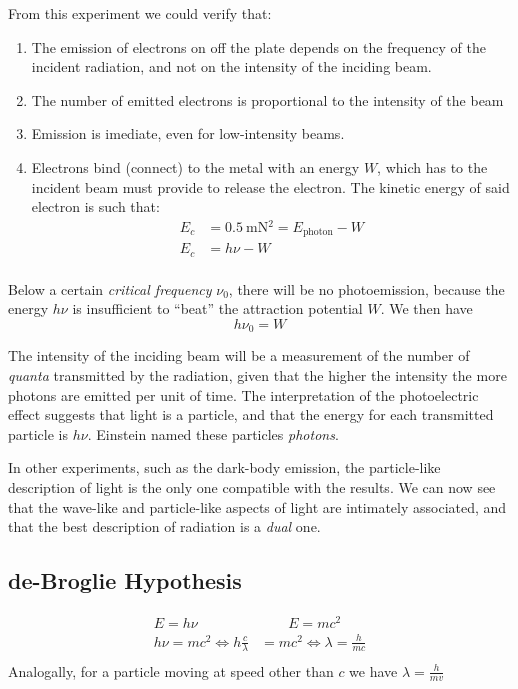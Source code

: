\documentclass[10pt]{article}
\begin{document}

From this experiment we could verify that:
\begin{enumerate}
	\item The emission of electrons on off the plate depends on the frequency of
	      the incident radiation, and not on the intensity of the inciding beam.
	\item The number of emitted electrons is proportional to the intensity of
	      the beam
	\item Emission is imediate, even for low-intensity beams.
	\item Electrons bind (connect) to the metal with an energy $W$, which has to
	      the incident beam must provide to release the electron. The kinetic
	      energy of said electron is such that:
	      \begin{align*}
	      	E_c & = \SI{0.5}{\metre\newton^2} = E_{\text{photon}} - W \\
	      	E_c & = h\nu - W                                          \\
	      \end{align*}
\end{enumerate}
Below a certain \emph{critical frequency} $\nu_0$, there will be no
photoemission, because the energy $h\nu$ is insufficient to ``beat''
the attraction potential $W$. We then have
$$h\nu_0 = W$$

The intensity of the inciding beam will be a measurement of the number of
\emph{quanta} transmitted by the radiation, given that the higher the intensity
the more photons are emitted per unit of time. The interpretation of the
photoelectric effect suggests that light is a particle, and that the energy for
each transmitted particle is $h\nu$. Einstein named these particles \emph{photons}.

In other experiments, such as the dark-body emission, the particle-like
description of light is the only one compatible with the results. We can now see
that the wave-like and particle-like aspects of light are intimately associated,
and that the best description of radiation is a \emph{dual} one.

\subsection{de-Broglie Hypothesis}
\begin{align*}
	E=h\nu                            & \qquad E=mc^2                      \\
	h\nu=mc^2 \iff h\frac{c}{\lambda} & = mc^2 \iff \lambda = \frac{h}{mc} \\
\end{align*}
Analogally, for a particle moving at speed other than $c$ we have $\lambda = \frac{h}{mv}$
\end{document}
